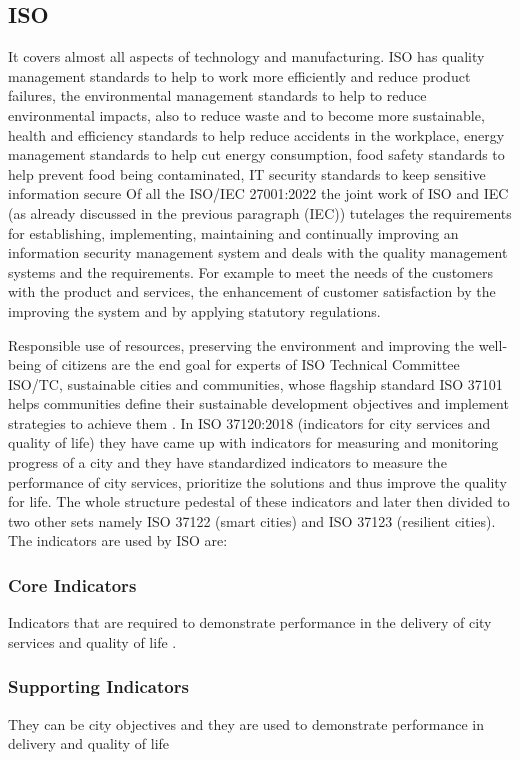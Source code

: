 \documentclass[sigconf]{acmart}
\begin{document}
\subsection{ISO}
It covers almost all aspects of technology and manufacturing. ISO has quality management standards to help to work more efficiently and reduce product failures, the environmental management standards to help to reduce environmental impacts, also to reduce waste and to become more sustainable, health and efficiency standards to help reduce accidents in the workplace, energy management standards to help cut energy consumption, food safety standards to help prevent food being contaminated, IT security standards to keep sensitive information secure \citep{whataresmartcities}
Of all the ISO/IEC 27001:2022 the joint work of ISO and IEC (as already discussed in the previous paragraph (IEC)) tutelages the requirements for establishing, implementing, maintaining and continually improving an information security management system \citep{whataresmartcities} and deals with the quality management systems and the requirements. For example to meet the needs of the customers with the product and services, the enhancement of customer satisfaction by the improving the system and by applying statutory regulations.


\par Responsible use of resources, preserving the environment and improving the well-being of citizens are the end goal for experts of ISO Technical Committee ISO/TC, sustainable cities and communities, whose flagship standard ISO 37101 helps communities define their sustainable development objectives and implement strategies to achieve them \citep{whataresmartcities}.
In ISO 37120:2018 (indicators for city services and quality of life) they have came up with indicators for measuring and monitoring progress of a city and they have standardized indicators to measure the performance of city services, prioritize the solutions and thus improve the quality for life. The whole structure pedestal of these indicators and later then divided to two other sets namely ISO 37122 (smart cities) and ISO 37123 (resilient cities). The indicators are used by ISO are:
\subsubsection{\textbf{Core Indicators}}
Indicators that are required to demonstrate performance in the delivery of city services and quality of life \citep{whataresmartcities}.
\subsubsection{\textbf{Supporting Indicators}}
They can be city objectives and they are used to demonstrate performance in delivery and quality of life\citep{whataresmartcities}
\end{document}
